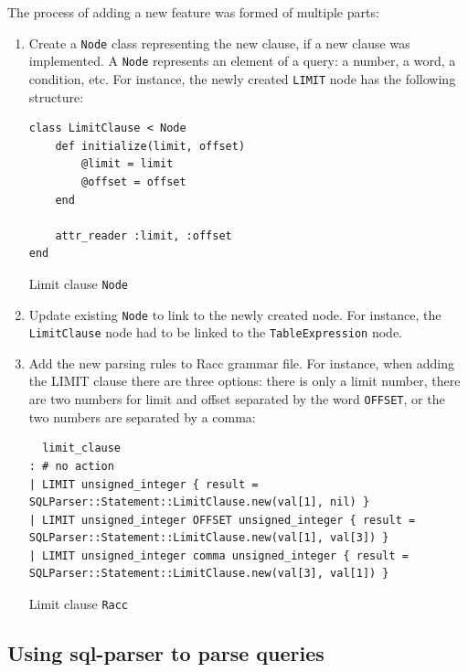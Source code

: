 The process of adding a new feature was formed of multiple parts:
\begin{enumerate}
    \item Create a \texttt{Node} class representing the new clause, if a new clause was implemented. A \texttt{Node} represents an element of a query: a number, a word, a condition, etc. For instance, the newly created \texttt{LIMIT} node has the following structure:
    \begin{listing}[H]\centering
\begin{verbatim}
class LimitClause < Node
    def initialize(limit, offset)
        @limit = limit
        @offset = offset
    end

    attr_reader :limit, :offset
end
\end{verbatim}
\caption{Limit clause \texttt{Node}}
\label{fig:limit_clause}
\end{listing}
    \item Update existing \texttt{Node} to link to the newly created node. For instance, the \texttt{LimitClause} node had to be linked to the \texttt{TableExpression} node.
    \item Add the new parsing rules to Racc grammar file. For instance, when adding the LIMIT clause there are three options: there is only a limit number, there are two numbers for limit and offset separated by the word \texttt{OFFSET}, or the two numbers are separated by a comma:
\begin{listing}[H]
    \centering
    \begin{verbatim}
  limit_clause
: # no action
| LIMIT unsigned_integer { result = SQLParser::Statement::LimitClause.new(val[1], nil) }
| LIMIT unsigned_integer OFFSET unsigned_integer { result = SQLParser::Statement::LimitClause.new(val[1], val[3]) }
| LIMIT unsigned_integer comma unsigned_integer { result = SQLParser::Statement::LimitClause.new(val[3], val[1]) }
    \end{verbatim}
    \caption{Limit clause \texttt{Racc}}
    \label{fig:limit_clause_racc}
\end{listing}
\end{enumerate}

\subsection{Using sql-parser to parse queries}

